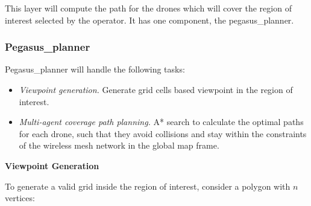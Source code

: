 This layer will compute the path for the drones which will cover the region of interest selected by the operator. It has one component, the pegasus\_planner.

\subsubsection{Pegasus\_planner}

Pegasus\_planner will handle the following tasks:
\begin{itemize}
	\item \textit{Viewpoint generation. } Generate grid cells based viewpoint in the region of interest.
	\item \textit{Multi-agent coverage path planning. } A* search to calculate the optimal paths for each drone, such that they avoid collisions and stay within the constraints of the wireless mesh network in the global map frame.
\end{itemize}

\textbf{Viewpoint Generation}

To generate a valid grid inside the region of interest, consider a polygon with $n$ vertices:

